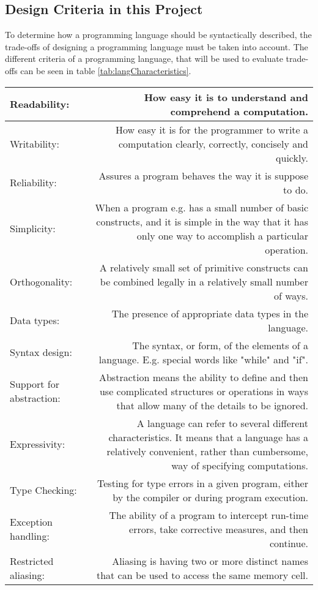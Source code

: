 \subsection{Design Criteria in this Project}
\label{sec:DesignCriteria}
To determine how a programming language should be syntactically described, the trade-offs of designing a programming language must be taken into account. The different criteria of a programming language, that will be used to evaluate trade-offs can be seen in table \ref{tab:langCharacteristics}.
\begin{table}[H]
	\begin{tabularx}{\textwidth}{|l|R|}
		\hline
		
		Readability:				& How easy it is to understand and comprehend a computation. 		\\ \hline
		Writability:				& How easy it is for the programmer to write a computation clearly, correctly, concisely and quickly.\\ \hline
		Reliability: 			& Assures a program behaves the way it is suppose to do.	\\ \hline
		Simplicity:				& When a program e.g. has a small number of basic constructs, and it is simple in the way that it has only one way to 									accomplish a particular operation.\\ \hline
		Orthogonality: 			& A relatively small set of primitive constructs can be combined legally in a relatively small number of ways.\\ \hline	
		Data types:				& The presence of appropriate data types in the language.\\ \hline
		Syntax design:			& The syntax, or form, of the elements of a language. E.g. special words like "while" and "if".\\ \hline
		Support for abstraction:	& Abstraction means the ability to define and then use complicated structures or operations in ways that allow many of the 									details	to be ignored.\\ \hline
		Expressivity:			& A language can refer to several different characteristics. It means that a language has a relatively convenient, rather 									than cumbersome, way of specifying computations.\\ \hline
		Type Checking:			& Testing for type errors in a given program, either by the compiler or during program execution.\\ \hline
		Exception handling:		& The ability of a program to intercept run-time errors, take corrective measures, and then continue.\\ \hline
		Restricted aliasing:		& Aliasing is having two or more distinct names that can be used to	access the same memory cell.\\ \hline
		

\end{tabularx}
\end{table}
